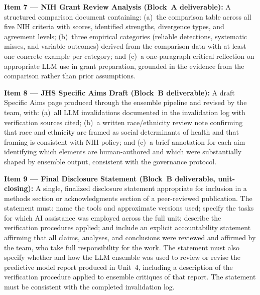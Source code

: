 \textbf{Item 7 --- NIH Grant Review Analysis (Block~A
deliverable):}
A structured comparison document containing: (a)~the comparison
table across all five NIH criteria with scores, identified
strengths, divergence types, and agreement levels; (b)~three
empirical categories (reliable detections, systematic misses,
and variable outcomes) derived from the comparison data with
at least one concrete example per category; and (c)~a one-paragraph
critical reflection on appropriate LLM use in grant preparation,
grounded in the evidence from the comparison rather than prior
assumptions.

\textbf{Item 8 --- JHS Specific Aims Draft (Block~B deliverable):}
A draft Specific Aims page produced through the ensemble pipeline
and revised by the team, with: (a)~all LLM invalidations
documented in the invalidation log with verification sources
cited; (b)~a written race/ethnicity review note confirming that
race and ethnicity are framed as social determinants of health
and that framing is consistent with NIH policy; and (c)~a brief
annotation for each aim identifying which elements are
human-authored and which were substantially shaped by ensemble
output, consistent with the governance protocol.

\textbf{Item 9 --- Final Disclosure Statement (Block~B
deliverable, unit-closing):}
A single, finalized disclosure statement appropriate for inclusion
in a methods section or acknowledgments section of a
peer-reviewed publication. The statement must: name the tools and
approximate versions used; specify the tasks for which AI
assistance was employed across the full unit; describe the
verification procedures applied; and include an explicit
accountability statement affirming that all claims, analyses,
and conclusions were reviewed and affirmed by the team, who
take full responsibility for the work. The statement must also
specify whether and how the LLM ensemble was used to review or
revise the predictive model report produced in Unit~4, including
a description of the verification procedure applied to ensemble
critiques of that report. The statement must be consistent with
the completed invalidation log.


